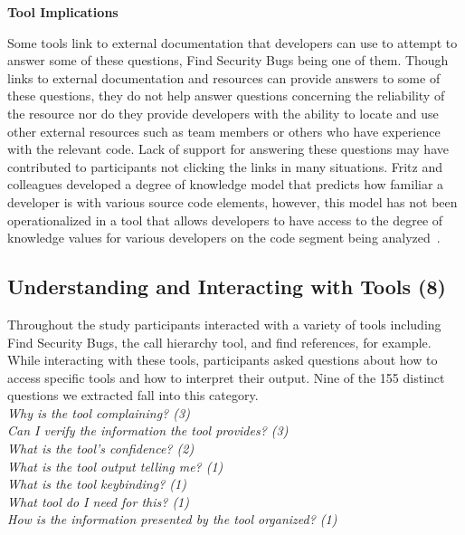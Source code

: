 \documentclass[conference]{IEEEtran}
\begin{document}
\noindent\textbf{Tool Implications}

Some tools link to external documentation that developers can use to attempt to answer some of these questions, Find Security Bugs being one of them. 
Though links to external documentation and resources can provide answers to some of these questions, they do not help answer questions concerning the reliability of the resource nor do they provide developers with the ability to locate and use other external resources such as team members or others who have experience with the relevant code.
Lack of support for answering these questions may have contributed to participants not clicking the links in many situations.  
Fritz and colleagues developed a degree of knowledge model that predicts how familiar a developer is with various source code elements, however, this model has not been operationalized in a tool that allows developers to have access to the degree of knowledge values for various developers on the code segment being analyzed~\cite{fritz2010degree}.




\noindent\subsection{\textbf{Understanding and Interacting with Tools (8)}}\label{uit}

Throughout the study participants interacted with a variety of tools including Find Security Bugs, the call hierarchy tool, and find references, for example. 
While interacting with these tools, participants asked questions about how to access specific tools and how to interpret their output. 
Nine of the 155 distinct questions we extracted fall into this category.
\\

\noindent\emph{Why is the tool complaining? (3)} \\
\emph{Can I verify the information the tool provides? (3)} \\
\emph{What is the tool's confidence? (2)} \\
\emph{What is the tool output telling me? (1)} \\
\emph{What is the tool keybinding? (1)} \\
\emph{What tool do I need for this? (1)} \\
\emph{How is the information presented by the tool organized? (1)} \\
\end{document}
